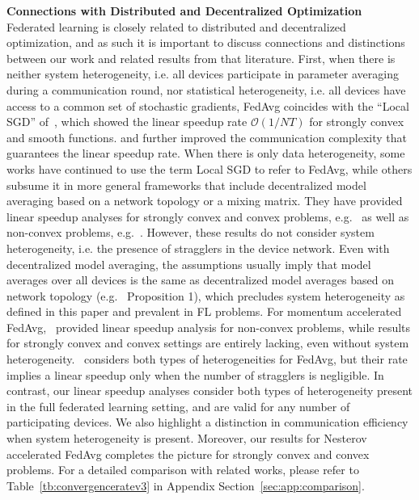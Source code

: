 \textbf{Connections with Distributed and Decentralized Optimization}
Federated learning is closely related to distributed and decentralized optimization, and as such it is important to discuss connections and distinctions between our work and related results from that literature. First, when there is neither system heterogeneity, i.e. all devices participate in parameter averaging during a communication round, nor statistical heterogeneity, i.e. all devices have access to a common set of stochastic gradients, FedAvg coincides with the ``Local SGD'' of~\cite{stich2018local}, which showed the linear speedup rate $\mathcal{O}(1/NT)$ for strongly convex and smooth functions. \cite{woodworth2020local} and \cite{woodworth2020minibatch} further improved the communication complexity that guarantees the linear speedup rate. When there is only data heterogeneity, some works have continued to use the term Local SGD to refer to FedAvg, while others subsume it in more general frameworks that include decentralized model averaging based on a network topology or a mixing matrix. They have provided linear speedup analyses for strongly convex and convex problems, e.g.~\cite{khaled2020tighter,koloskova2020unified} as well as non-convex problems, e.g.~\cite{jiang2018linear,yu2019parallel,wang2018cooperative}. However, these results do not consider system heterogeneity, i.e. the presence of stragglers in the device network. Even with decentralized model averaging, the assumptions usually imply that model averages over all devices is the same as decentralized model averages based on network topology (e.g.~\cite{koloskova2020unified} Proposition 1), which precludes system heterogeneity as defined in this paper and prevalent in FL problems. For momentum accelerated FedAvg,~\cite{yu2019linear} provided linear speedup analysis for non-convex problems, while results for strongly convex and convex settings are entirely lacking, even without system heterogeneity.~\cite{karimireddy2019scaffold} considers both types of heterogeneities for FedAvg, but their rate implies a linear speedup only when the number of stragglers is negligible. In contrast, our linear speedup analyses consider both types of heterogeneity present in the full federated learning setting, and are valid for any number of participating devices. We also highlight a distinction in communication efficiency when system heterogeneity is present. Moreover, our results for Nesterov accelerated FedAvg completes the picture for strongly convex and convex problems. For a detailed comparison with related works, please refer to Table~\ref{tb:convergenceratev3} in Appendix Section~\ref{sec:app:comparison}.

